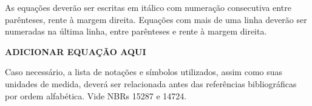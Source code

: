 \documentclass[../main.tex]{subfiles}
\begin{document}
  As equações deverão ser escritas em itálico com numeração consecutiva  entre  parênteses,  rente  à  margem  direita.  Equações  com  mais  de  uma  linha  deverão  ser  numeradas  na  última  linha,  entre  parênteses  e  rente  à  margem  direita.

  \textbf{ADICIONAR EQUAÇÃO AQUI}

  Caso necessário, a lista de notações e símbolos utilizados, assim como  suas unidades de medida, deverá ser relacionada antes das referências  bibliográficas por ordem alfabética. Vide NBRs 15287 e 14724.
\end{document}
